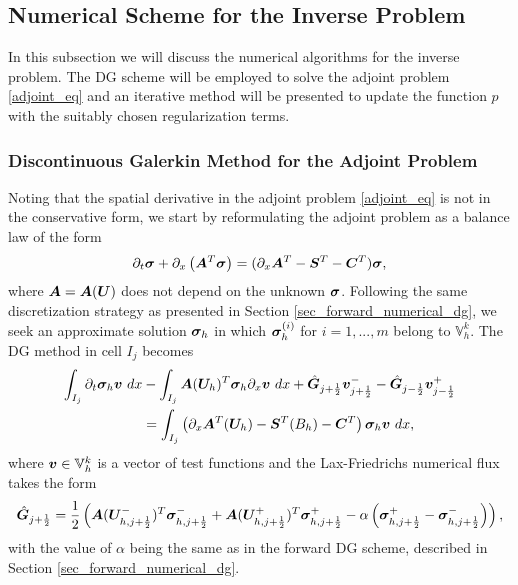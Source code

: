 %




\subsection{Numerical Scheme for the Inverse Problem}
In this subsection we will discuss the numerical algorithms for the inverse problem. The DG scheme will be employed to solve the adjoint problem \eqref{adjoint_eq} and an iterative method will be presented to update the function $p$ with the suitably chosen regularization terms.


\subsubsection{Discontinuous Galerkin Method for the Adjoint Problem}\label{sec_adjoint_numerical_dg}
Noting that the spatial derivative in the adjoint problem \eqref{adjoint_eq} is not in the conservative form, 
we start by reformulating the adjoint problem as a balance law of the form 
\begin{equation}
    \partial_t \bm{\sigma} + \partial_x\left(\bm{A}^T\bm{\sigma}\right)  = (\partial_x\bm{A}^T-\bm{S}^T - \bm{C}^T)\bm{\sigma},
\end{equation}
where $\bm{A}=\bm{A}(\bm{U})$ does not depend on the unknown $\bm{\sigma}$.
Following the same discretization strategy as presented in Section \ref{sec_forward_numerical_dg}, we seek an approximate solution $\bm{\sigma}_h$ in which $\bm{\sigma}_h^{(i)}$ for $i=1,..., m$ belong to $\mathbb{V}_h^k$. The DG method in cell $I_j$ becomes
\begin{equation} \label{eq:dgform_adjoint}
\begin{split}
\int_{I_j}\partial_t \bm{\sigma}_h \bm{v} \ dx 
& - \int_{I_j} \bm{A}(\bm{U}_h)^T\bm{\sigma}_h \partial_x {\bm{v}} \ dx 
+ \hat{\bm{G}}_{j+\frac{1}{2}}\bm{v}^-_{j+\frac{1}{2}}
-\hat{\bm{G}}_{j-\frac{1}{2}}\bm{v}^+_{j-\frac{1}{2}} \\
& =\int_{I_j} \left(\partial_x \bm{A}^T(\bm{U}_h) - \bm{S}^T(B_h) - \bm{C}^T\right)\bm{\sigma}_h \bm{v} \ dx, 
\end{split}
\end{equation}
where $\bm{v} \in \mathbb{V}^k_h$ is a vector of test functions and the Lax-Friedrichs numerical flux takes the form
\begin{equation}
    \hat{\bm{G}}_{j+\frac{1}{2}} 
    = \frac{1}{2}\left(
    \bm{A}(\bm{U}_{h,j+\frac{1}{2}}^-)^T\bm{\sigma}_{h,j+\frac{1}{2}}^- 
    + \bm{A}(\bm{U}_{h,j+\frac{1}{2}}^+)^T\bm{\sigma}_{h,j+\frac{1}{2}}^+ 
    - \alpha\left(\bm{\sigma}_{h,j+\frac{1}{2}}^+-\bm{\sigma}_{h,j+\frac{1}{2}}^-\right)\right),
\end{equation}
with the value of $\alpha$ being the same as in the forward DG scheme, described in Section \ref{sec_forward_numerical_dg}.

